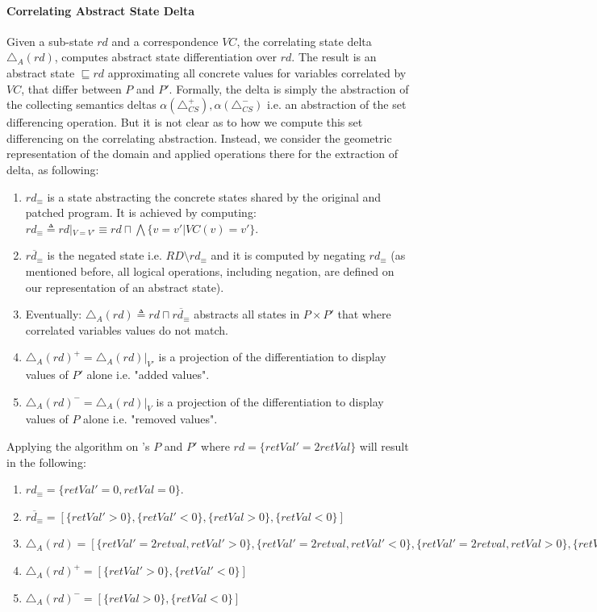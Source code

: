 \paragraph{Correlating Abstract State Delta} 
Given a sub-state $rd$ and a correspondence $VC$, the correlating state delta $\triangle_{A}(rd)$, computes abstract state differentiation over $rd$. The result is an abstract state $\sqsubseteq rd$ approximating all concrete values for variables correlated by $VC$, that differ between $P$ and $P'$. Formally, the delta is simply the abstraction of the collecting semantics deltas $\alpha(\triangle_{CS}^{+}), \alpha(\triangle_{CS}^{-})$ i.e. an abstraction of the set differencing operation. But it is not clear as to how we compute this set differencing on the correlating abstraction. Instead, we consider the geometric representation of the domain and applied operations there for the extraction of delta, as following:
\begin{enumerate}
\item $rd_{\equiv}$ is a state abstracting the concrete states shared by the original and patched program. It is achieved by computing: $rd_{\equiv} \triangleq rd|_{V=V'} \equiv rd \sqcap \bigwedge\{ v = v' | VC(v) = v'\}$.
\item $\overline{rd_{\equiv}}$ is the negated state i.e. $RD \setminus rd_{\equiv}$ and it is computed by negating $rd_{\equiv}$ (as mentioned before, all logical operations, including negation, are defined on our representation of an abstract state).
\item Eventually: $\triangle_{A}(rd) \triangleq rd \sqcap \overline{rd_{\equiv}}$ abstracts all states in $P \times P'$ that where correlated variables values do not match.
\item $\triangle_{A}(rd)^{+} = \triangle_{A}(rd)|_{V'}$ is a projection of the differentiation to display values of $P'$ alone i.e. "added values".
\item $\triangle_{A}(rd)^{-} = \triangle_{A}(rd)|_{V}$ is a projection of the differentiation to display values of $P$ alone i.e. "removed values".
\end{enumerate}
Applying the algorithm on 's $P$ and $P'$ where $rd = \{ retVal' = 2retVal \}$ will result in the following: 
\begin{enumerate}
\item $rd_{\equiv} = \{ retVal' = 0, retVal = 0 \}$.
\item $\overline{rd_{\equiv}} = [ \{ retVal' > 0 \}, \{ retVal' < 0 \}, \{ retVal > 0 \}, \{ retVal < 0 \} ]$
\item $\triangle_{A}(rd)  = [ \{ retVal' = 2retval, retVal' > 0 \}, \{ retVal' = 2retval, retVal' < 0 \}, \{ retVal' = 2retval, retVal > 0 \}, \{ retVal' = 2retval, retVal < 0 \} ]$
\item $\triangle_{A}(rd)^{+} = [ \{ retVal' > 0 \}, \{ retVal' < 0 \} ]$
\item $\triangle_{A}(rd)^{-} = [\{ retVal > 0 \}, \{ retVal < 0 \}]$
\end{enumerate}
